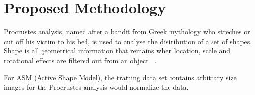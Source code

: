 \chapter{Proposed Methodology}

Procrustes analysis, named after a bandit from Greek mythology who streches or cut off his victim to his bed, is used to analyse the distribution of a set of shapes. Shape is all geometrical information that remains when location, scale and rotational effects are filtered out from an object ~\cite{IMM2002-0403}. 

For ASM (Active Shape Model), the training data set contains arbitrary size images for the Procrustes analysis would normalize the data. 